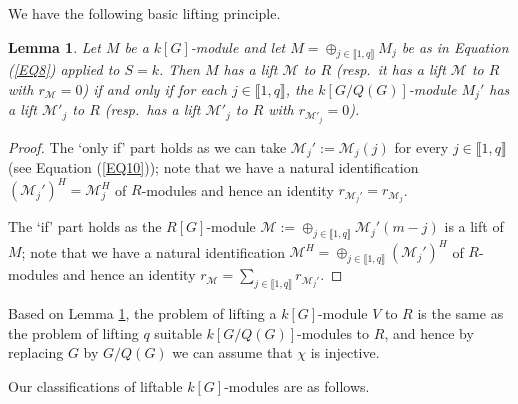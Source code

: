 \documentclass[11pt]{amsart}
\newtheorem{lemma}[theorem]{Lemma}
\begin{document}
We have the following basic lifting principle. 

\begin{lemma}\label{L1}
Let $M$ be a $k[G]$-module and let $M=\oplus_{j\in\llbracket1,q\rrbracket} M_j$ be as in Equation (\ref{EQ8}) applied to $S=k$. Then $M$ has a lift $\mathcal M$ to $R$ (resp.\ it has a lift $\mathcal M$ to $R$ with $r_{\mathcal M}=0$) if and only if  for each $j\in\llbracket1,q\rrbracket$, the $k[G/Q(G)]$-module $M_j'$ has a lift $\mathcal M'_j$ to $R$ (resp.\ has a lift $\mathcal M'_j$ to $R$ with $r_{\mathcal M'_j}=0$).
\end{lemma}

\begin{proof} The `only if' part holds as we can take $\mathcal M_j':=\mathcal M_j(j)$ for every $j\in\llbracket1,q\rrbracket$ (see Equation (\ref{EQ10})); note that we have a natural identification $(\mathcal M_j')^H=\mathcal M_j^H$ of $R$-modules and hence an identity $r_{\mathcal M_j'}=r_{\mathcal M_j}$. 

The `if' part holds as the $R[G]$-module $\mathcal M:=\oplus_{j\in\llbracket1,q\rrbracket} \mathcal M_j'(m-j)$ is a lift of $M$; note that we have a natural identification $\mathcal M^H=\oplus_{j\in\llbracket1,q\rrbracket} (\mathcal M_j')^H$ of $R$-modules and hence an identity $r_{\mathcal M}=\sum_{j\in\llbracket1,q\rrbracket} r_{\mathcal M_j'}$.\end{proof}

\smallskip
Based on Lemma \ref{L1}, the problem of lifting a $k[G]$-module $V$ to $R$ is the same as the problem of lifting $q$ suitable $k[G/Q(G)]$-modules to $R$, and hence by replacing $G$ by $G/Q(G)$ we can assume that $\chi$ is injective.

Our classifications of liftable $k[G]$-modules are as follows.
\end{document}
